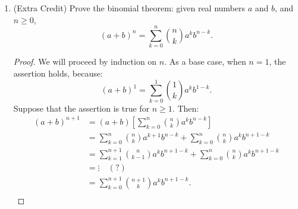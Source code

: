 \documentclass[12pt]{amsart}
\begin{document}
\begin{enumerate}
\item (Extra Credit)
Prove the binomial theorem: given real numbers $a$ and $b$, and $n\geq
0$,
\[ (a+b)^n = \sum_{k=0}^n \binom{n}{k}a^kb^{n-k}. \]

\begin{proof}
We will proceed by induction on $n$. As a base case, when $n=1$, the assertion holds, because:
\[ (a+b)^1 = \sum_{k=0}^1 \binom{1}{k}a^kb^{1-k}. \]
Suppose that the assertion is true for $n\geq 1$. Then:
\begin{align*}
(a+b)^{n+1} &= (a+b) \left[ \sum_{k=0}^n \binom{n}{k}a^kb^{n-k} \right] \\
&= \sum_{k=0}^n \binom{n}{k}a^{k+1}b^{n-k} + \sum_{k=0}^n \binom{n}{k}a^kb^{n+1-k} \\
&= \sum_{k=1}^{n+1} \binom{n}{k-1}a^{k}b^{n+1-k} + \sum_{k=0}^n \binom{n}{k}a^kb^{n+1-k} \\
&= \vdots \quad (?) \\
&= \sum_{k=0}^{n+1} \binom{{n+1}}{k}a^kb^{{n+1}-k}. \\
\end{align*}

\end{proof}

\end{enumerate}
\end{document}
